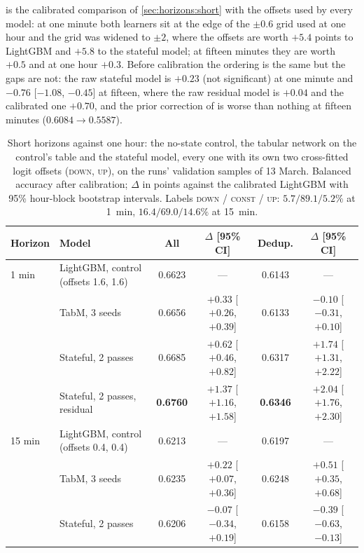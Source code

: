  is the calibrated comparison of \cref{sec:horizons:short} with the
offsets used by every model: at one minute both learners sit at the edge of the $\pm 0.6$
grid used at one hour and the grid was widened to $\pm 2$, where the offsets are worth $+5.4$
points to LightGBM and $+5.8$ to the stateful model; at fifteen minutes they are worth $+0.5$ and
at one hour $+0.3$.  Before calibration the ordering is the same but the gaps are not: the
raw stateful model is $+0.23$ (not significant) at one minute and $-0.76$ [$-1.08$, $-0.45$]
at fifteen, where the raw residual model is $+0.04$ and the calibrated one $+0.70$, and the
prior correction of \textcite{menon2021logitadjustment} is worse than
nothing at fifteen minutes ($0.6084 \to 0.5587$).

\begin{table}[t]
\centering
\caption{Short horizons against one hour: the no-state control, the tabular network on the
control's table and the stateful model, every one with its own two cross-fitted logit
offsets (\textsc{down}, \textsc{up}), on the runs' validation samples of 13 March.  Balanced
accuracy after calibration; $\Delta$ in points against the calibrated LightGBM with 95\%
hour-block bootstrap intervals.  Labels \textsc{down} / \textsc{const} / \textsc{up}: $5.7 / 89.1 / 5.2\%$ at 1~min,
$16.4 / 69.0 / 14.6\%$ at 15~min.}
\label{tab:exp:short}
\small
\begin{fittable}\begin{tabular}{llcccc}
\toprule
Horizon & Model & All & $\Delta$ [95\% CI] & Dedup. & $\Delta$ [95\% CI] \\
\midrule
1 min  & LightGBM, control (offsets 1.6, 1.6)  & 0.6623 & --- & 0.6143 & --- \\
       & TabM, 3 seeds                   & 0.6656 & $+0.33$ [$+0.26$, $+0.39$] & 0.6133 & $-0.10$ [$-0.31$, $+0.10$] \\
       & Stateful, 2 passes              & 0.6685 & $+0.62$ [$+0.46$, $+0.82$] & 0.6317 & $+1.74$ [$+1.31$, $+2.22$] \\
       & Stateful, 2 passes, residual    & \textbf{0.6760} & $\mathbf{+1.37}$ [$+1.16$, $+1.58$] & \textbf{0.6346} & $\mathbf{+2.04}$ [$+1.76$, $+2.30$] \\
\midrule
15 min & LightGBM, control (offsets 0.4, 0.4)  & 0.6213 & --- & 0.6197 & --- \\
       & TabM, 3 seeds                   & 0.6235 & $+0.22$ [$+0.07$, $+0.36$] & 0.6248 & $+0.51$ [$+0.35$, $+0.68$] \\
       & Stateful, 2 passes              & 0.6206 & $-0.07$ [$-0.34$, $+0.19$] & 0.6158 & $-0.39$ [$-0.63$, $-0.13$] \\

\end{tabular}
\end{fittable}
\end{table}
